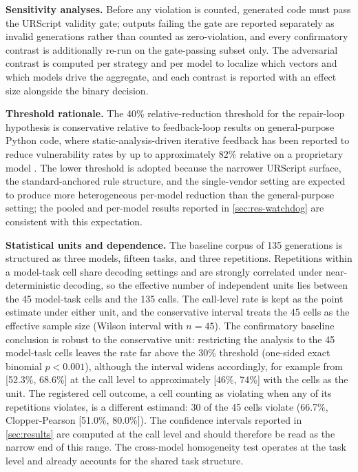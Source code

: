\documentclass{ieeeaccess}
\begin{document}
\textbf{Sensitivity analyses.} Before any violation is counted, generated code must
pass the URScript validity gate; outputs failing the gate are reported separately as
invalid generations rather than counted as zero-violation, and every confirmatory
contrast is additionally re-run on the gate-passing subset only. The adversarial
contrast is computed per strategy and per model to localize which vectors and which
models drive the aggregate, and each contrast is reported with an effect size alongside
the binary decision.

\textbf{Threshold rationale.} The 40\% relative-reduction threshold for the repair-loop
hypothesis is conservative relative to feedback-loop results on general-purpose Python
code, where static-analysis-driven iterative feedback has been reported to reduce
vulnerability rates by up to approximately 82\% relative on a proprietary model
\cite{ref51}. The lower threshold is adopted because the narrower URScript surface, the
standard-anchored rule structure, and the single-vendor setting are expected to produce
more heterogeneous per-model reduction than the general-purpose setting; the pooled and
per-model results reported in \ref{sec:res-watchdog} are consistent with this
expectation.

\textbf{Statistical units and dependence.} The baseline corpus of 135 generations is
structured as three models, fifteen tasks, and three repetitions. Repetitions within a
model-task cell share decoding settings and are strongly correlated under
near-deterministic decoding, so the effective number of independent units lies between
the 45 model-task cells and the 135 calls. The call-level rate is kept as the point estimate under
either unit, and the conservative interval treats the 45 cells as the effective sample size
(Wilson interval with $n=45$). The confirmatory baseline conclusion is robust to the conservative unit:
restricting the analysis to the 45 model-task cells leaves the rate far above the 30\%
threshold (one-sided exact binomial $p<0.001$), although the interval widens
accordingly, for example from [52.3\%, 68.6\%] at the call level to approximately
[46\%, 74\%] with the cells as the unit. The registered cell outcome, a cell counting as
violating when any of its repetitions violates, is a different estimand: 30 of the 45 cells
violate (66.7\%, Clopper-Pearson [51.0\%, 80.0\%]). The confidence intervals reported in \ref{sec:results}
are computed at the call level and should therefore be read as the narrow end of this
range. The cross-model homogeneity test operates at the task level and already accounts
for the shared task structure.
\end{document}
